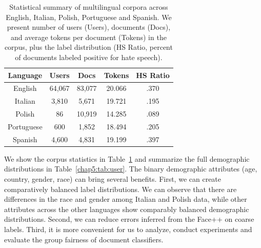 \begin{table}[tb!]
\centering
\begin{tabular}{c||cccc}
Language & Users & Docs & Tokens & HS Ratio \\\hline\hline
English & 64,067 & 83,077 & 20.066 & .370 \\
Italian & 3,810 & 5,671 & 19.721 & .195 \\
Polish & 86 & 10,919 & 14.285 & .089 \\
Portuguese & 600 & 1,852 & 18.494 & .205 \\
Spanish & 4,600 & 4,831 & 19.199 & .397
\end{tabular}
\caption{Statistical summary of multilingual corpora across English, Italian, Polish, Portuguese and Spanish. We present number of users (Users), documents (Docs), and average tokens per document (Tokens) in the corpus, 
plus the label distribution (HS Ratio, percent of documents labeled positive for hate speech).}
\label{chap5:tab:corpus}
\end{table}

We show the corpus statistics in Table~\ref{chap5:tab:corpus} and summarize the full demographic distributions in Table~\ref{chap5:tab:user}. 
The binary demographic attributes (age, country, gender, race) can bring several benefits. 
First, we can create comparatively balanced label distributions. 
We can observe that there are differences in the race and gender among Italian and Polish data, while other attributes across the other languages show comparably balanced demographic distributions.
Second, we can reduce errors inferred from the Face++ on coarse labels.
Third, it is more convenient for us to analyze, conduct experiments and evaluate the group fairness of document classifiers.


